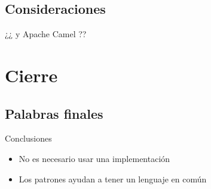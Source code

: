 \documentclass{beamer}
\begin{document}
\subsection{Consideraciones}
\begin{frame}
\end{frame}

\begin{frame}
\begin{center}
\Large{¿¿ y Apache Camel ??}
\end{center}
\end{frame}


\section{Cierre}
\subsection{Palabras finales}

\begin{frame}{Conclusiones}
\begin{itemize}
\item No es necesario usar una implementación
\item Los patrones ayudan a tener un lenguaje en común
\end{itemize}
\end{frame}
\end{document}
